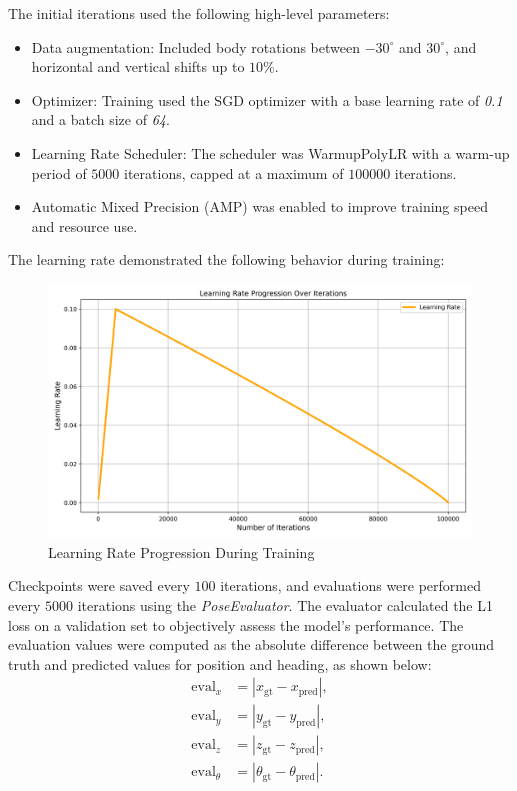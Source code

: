 The initial iterations used the following high-level parameters:
\begin{itemize}
    \item Data augmentation: Included body rotations between $-30^\circ$ and $30^\circ$, and horizontal and vertical shifts up to $10\%$.
    \item Optimizer: Training used the SGD optimizer with a base learning rate of \textit{0.1} and a batch size of \textit{64}.
    \item Learning Rate Scheduler: The scheduler was WarmupPolyLR \cite{kalra2024warmuplearningrateunderlying} with a warm-up period of $5000$ iterations, capped at a maximum of $100000$ iterations.
    \item Automatic Mixed Precision (AMP) was enabled to improve training speed and resource use.
\end{itemize}

The learning rate demonstrated the following behavior during training:
\begin{figure}[H]
    \centering
    \includegraphics[width=0.75\linewidth]{LateX//figs/learning_rate_progression.png}
    \caption{Learning Rate Progression During Training}
    \label{fig:learning-rate-progression}
\end{figure}

Checkpoints were saved every $100$ iterations, and evaluations were performed every $5000$ iterations using the \textit{PoseEvaluator}. The evaluator calculated the L1 loss on a validation set to objectively assess the model’s performance. The evaluation values were computed as the absolute difference between the ground truth and predicted values for position and heading, as shown below:
\begin{align}
    \text{eval}_x &= |x_{\text{gt}} - x_{\text{pred}}|, \\
    \text{eval}_y &= |y_{\text{gt}} - y_{\text{pred}}|, \\
    \text{eval}_z &= |z_{\text{gt}} - z_{\text{pred}}|, \\
    \text{eval}_{\theta} &= |\theta_{\text{gt}} - \theta_{\text{pred}}|.
\end{align}

